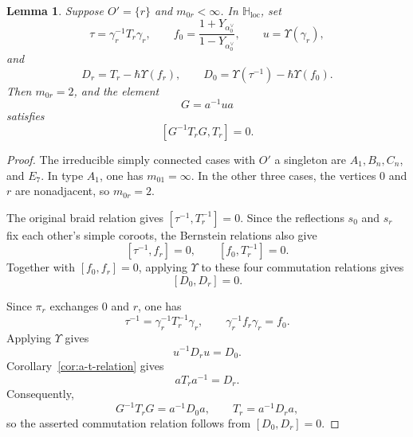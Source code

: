 \documentclass{amsart}
\newtheorem{Lem}[Thm]{Lemma}
\theoremstyle{definition}
\numberwithin{equation}{section}
\begin{document}
\begin{Lem}\label{lem:singleton-eliminated-braid}
Suppose \(O'=\{r\}\) and \(m_{0r}<\infty\). In
\(\mathbb H_{\mathrm{loc}}\), set
\[
\tau=\gamma_r^{-1}T_r\gamma_r,
\qquad
f_0=\frac{1+Y_{\alpha_0^\vee}}{1-Y_{\alpha_0^\vee}},
\qquad
u=\Upsilon(\gamma_r),
\]
and
\[
D_r=T_r-\hbar\Upsilon(f_r),
\qquad
D_0=\Upsilon(\tau^{-1})-\hbar\Upsilon(f_0).
\]
Then \(m_{0r}=2\), and the element
\[
G=a^{-1}ua
\]
satisfies
\[
[G^{-1}T_rG,T_r]=0.
\]
\end{Lem}
\begin{proof}
The irreducible simply connected cases with \(O'\) a singleton are
\(A_1,B_n,C_n\), and \(E_7\). In type \(A_1\), one has
\(m_{01}=\infty\). In the other three cases, the vertices \(0\) and \(r\)
are nonadjacent, so \(m_{0r}=2\).

The original braid relation gives
\([\tau^{-1},T_r^{-1}]=0\). Since the reflections \(s_0\) and \(s_r\)
fix each other's simple coroots, the Bernstein relations also give
\[
[\tau^{-1},f_r]=0,
\qquad
[f_0,T_r^{-1}]=0.
\]
Together with \([f_0,f_r]=0\), applying \(\Upsilon\) to these four
commutation relations gives
\[
[D_0,D_r]=0.
\]

Since \(\pi_r\) exchanges \(0\) and \(r\), one has
\[
\tau^{-1}=\gamma_r^{-1}T_r^{-1}\gamma_r,
\qquad
\gamma_r^{-1}f_r\gamma_r=f_0.
\]
Applying \(\Upsilon\) gives
\[
u^{-1}D_ru=D_0.
\]
Corollary~\ref{cor:a-t-relation} gives
\[
aT_ra^{-1}=D_r.
\]
Consequently,
\[
G^{-1}T_rG=a^{-1}D_0a,
\qquad
T_r=a^{-1}D_ra,
\]
so the asserted commutation relation follows from \([D_0,D_r]=0\).
\end{proof}
\end{document}
